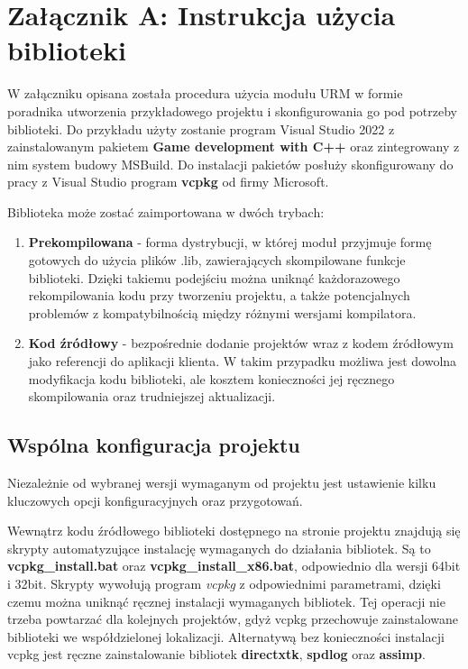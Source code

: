 \chapter*{Załącznik A: Instrukcja użycia biblioteki}
W załączniku opisana została procedura użycia modułu URM w formie poradnika utworzenia przykładowego projektu i skonfigurowania go pod potrzeby biblioteki. Do przykładu użyty zostanie program Visual Studio 2022 z zainstalowanym pakietem \textbf{Game development with C++} oraz zintegrowany z nim system budowy MSBuild. Do instalacji pakietów posłuży skonfigurowany do pracy z Visual Studio program \textbf{vcpkg} od firmy Microsoft. 

Biblioteka może zostać zaimportowana w dwóch trybach:
\begin{enumerate}
	\item \textbf{Prekompilowana} - forma dystrybucji, w której moduł przyjmuje formę gotowych do użycia plików .lib, zawierających skompilowane funkcje biblioteki. Dzięki takiemu podejściu można uniknąć każdorazowego rekompilowania kodu przy tworzeniu projektu, a także potencjalnych problemów z kompatybilnością między różnymi wersjami kompilatora. 
	\item \textbf{Kod źródłowy} - bezpośrednie dodanie projektów wraz z kodem źródłowym jako referencji do aplikacji klienta. W takim przypadku możliwa jest dowolna modyfikacja kodu biblioteki, ale kosztem konieczności jej ręcznego skompilowania oraz trudniejszej aktualizacji.
\end{enumerate}

\section*{Wspólna konfiguracja projektu}
Niezależnie od wybranej wersji wymaganym od projektu jest ustawienie kilku kluczowych opcji konfiguracyjnych oraz przygotowań.

Wewnątrz kodu źródłowego biblioteki dostępnego na stronie projektu \cite{GitHub:Minik:MasterThesisUniversalRenderingModuleD3D11} znajdują się skrypty automatyzujące instalację wymaganych do działania bibliotek. Są to \textbf{vcpkg\_install.bat} oraz \textbf{vcpkg\_install\_x86.bat}, odpowiednio dla wersji 64bit i 32bit. Skrypty wywołują program \textit{vcpkg} z odpowiednimi parametrami, dzięki czemu można uniknąć ręcznej instalacji wymaganych bibliotek. Tej operacji nie trzeba powtarzać dla kolejnych projektów, gdyż vcpkg przechowuje zainstalowane biblioteki we współdzielonej lokalizacji. Alternatywą bez konieczności instalacji vcpkg jest ręczne zainstalowanie bibliotek \textbf{directxtk}, \textbf{spdlog} oraz \textbf{assimp}.

